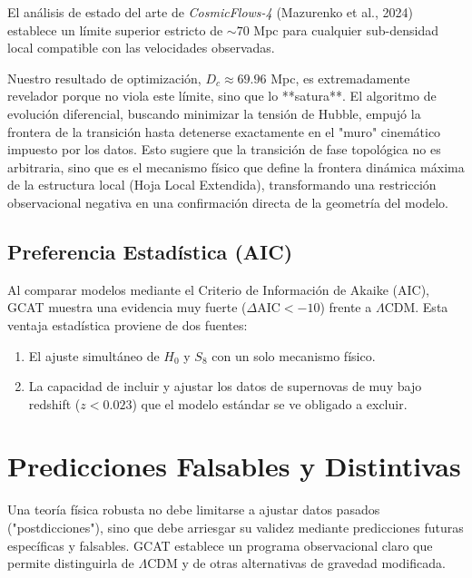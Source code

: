 \documentclass[12pt, a4paper]{article}
\theoremstyle{plain}
\theoremstyle{definition}
\begin{document}
El análisis de estado del arte de \textit{CosmicFlows-4} (Mazurenko et al., 2024) establece un límite superior estricto de $\sim 70$ Mpc para cualquier sub-densidad local compatible con las velocidades observadas.

Nuestro resultado de optimización, $D_c \approx 69.96$ Mpc, es extremadamente revelador porque no viola este límite, sino que lo **satura**. El algoritmo de evolución diferencial, buscando minimizar la tensión de Hubble, empujó la frontera de la transición hasta detenerse exactamente en el "muro" cinemático impuesto por los datos. Esto sugiere que la transición de fase topológica no es arbitraria, sino que es el mecanismo físico que define la frontera dinámica máxima de la estructura local (Hoja Local Extendida), transformando una restricción observacional negativa en una confirmación directa de la geometría del modelo.

\subsection{Preferencia Estadística (AIC)}

Al comparar modelos mediante el Criterio de Información de Akaike (AIC), GCAT muestra una evidencia muy fuerte ($\Delta \text{AIC} < -10$) frente a $\Lambda$CDM. Esta ventaja estadística proviene de dos fuentes:
\begin{enumerate}
    \item El ajuste simultáneo de $H_0$ y $S_8$ con un solo mecanismo físico.
    \item La capacidad de incluir y ajustar los datos de supernovas de muy bajo redshift ($z < 0.023$) que el modelo estándar se ve obligado a excluir.
\end{enumerate}




\section{Predicciones Falsables y Distintivas}
\label{sec:predicciones}

Una teoría física robusta no debe limitarse a ajustar datos pasados ("postdicciones"), sino que debe arriesgar su validez mediante predicciones futuras específicas y falsables. GCAT establece un programa observacional claro que permite distinguirla de $\Lambda$CDM y de otras alternativas de gravedad modificada.
\end{document}
